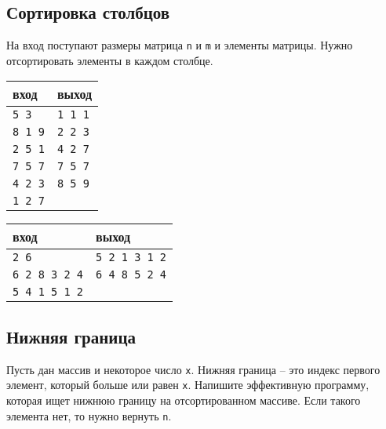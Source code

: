 \documentclass{article}
\begin{document}
\subsection{Сортировка столбцов}
На вход поступают размеры матрица \texttt{n} и \texttt{m} и элементы матрицы. Нужно отсортировать элементы в каждом столбце.
\begin{multicols}{2}
\begin{center}
\begin{tabular}{ l | l }
 вход & выход \\ \hline
 \texttt{5 3} &    \texttt{1 1 1} \\ 
 \texttt{8 1 9} &  \texttt{2 2 3}\\
 \texttt{2 5 1} &  \texttt{4 2 7}\\ 
 \texttt{7 5 7} &  \texttt{7 5 7}\\ 
 \texttt{4 2 3} &  \texttt{8 5 9}\\ 
 \texttt{1 2 7} &  \\ 
\end{tabular}
\end{center}

\begin{center}
\begin{tabular}{ l | l }
 вход & выход \\ \hline
 \texttt{2 6} &          \texttt{5 2 1 3 1 2} \\ 
 \texttt{6 2 8 3 2 4} &  \texttt{6 4 8 5 2 4}\\
 \texttt{5 4 1 5 1 2} & \\ 
\end{tabular}
\end{center}
\end{multicols}



\subsection{Нижняя граница}
Пусть дан массив и некоторое число \texttt{x}. Нижняя граница -- это индекс первого элемент, который больше или равен \texttt{x}. Напишите эффективную программу, которая ищет нижнюю границу на отсортированном массиве. Если такого элемента нет, то нужно вернуть \texttt{n}.
\end{document}
